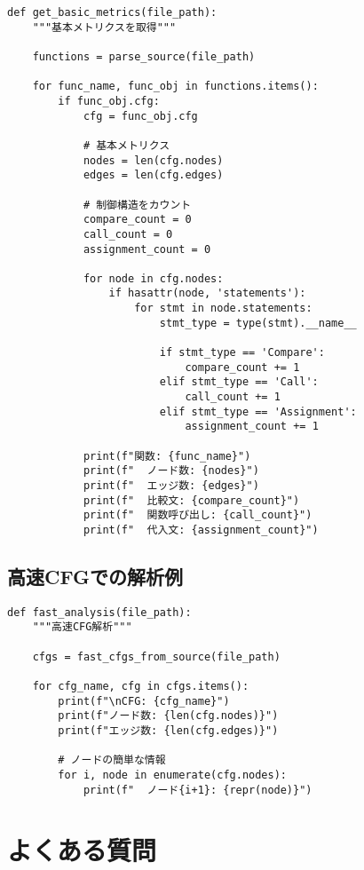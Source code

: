 \documentclass[12pt,a4paper]{article}
\begin{document}
\begin{lstlisting}
def get_basic_metrics(file_path):
    """基本メトリクスを取得"""

    functions = parse_source(file_path)

    for func_name, func_obj in functions.items():
        if func_obj.cfg:
            cfg = func_obj.cfg

            # 基本メトリクス
            nodes = len(cfg.nodes)
            edges = len(cfg.edges)

            # 制御構造をカウント
            compare_count = 0
            call_count = 0
            assignment_count = 0

            for node in cfg.nodes:
                if hasattr(node, 'statements'):
                    for stmt in node.statements:
                        stmt_type = type(stmt).__name__

                        if stmt_type == 'Compare':
                            compare_count += 1
                        elif stmt_type == 'Call':
                            call_count += 1
                        elif stmt_type == 'Assignment':
                            assignment_count += 1

            print(f"関数: {func_name}")
            print(f"  ノード数: {nodes}")
            print(f"  エッジ数: {edges}")
            print(f"  比較文: {compare_count}")
            print(f"  関数呼び出し: {call_count}")
            print(f"  代入文: {assignment_count}")
\end{lstlisting}

\subsection{高速CFGでの解析例}

\begin{lstlisting}
def fast_analysis(file_path):
    """高速CFG解析"""

    cfgs = fast_cfgs_from_source(file_path)

    for cfg_name, cfg in cfgs.items():
        print(f"\nCFG: {cfg_name}")
        print(f"ノード数: {len(cfg.nodes)}")
        print(f"エッジ数: {len(cfg.edges)}")

        # ノードの簡単な情報
        for i, node in enumerate(cfg.nodes):
            print(f"  ノード{i+1}: {repr(node)}")
\end{lstlisting}

\section{よくある質問}
\end{document}
